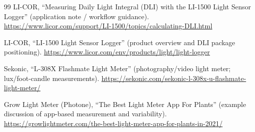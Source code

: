 \documentclass[11pt]{article}
\begin{document}
\begin{thebibliography}{99}
LI-COR, ``Measuring Daily Light Integral (DLI) with the LI-1500 Light Sensor Logger'' (application note / workflow guidance).
\href{https://www.licor.com/support/LI-1500/topics/calculating-DLI.html}{https://www.licor.com/support/LI-1500/topics/calculating-DLI.html}

LI-COR, ``LI-1500 Light Sensor Logger'' (product overview and DLI package positioning).
\href{https://www.licor.com/env/products/light/light-logger}{https://www.licor.com/env/products/light/light-logger}

Sekonic, ``L-308X Flashmate Light Meter'' (photography/video light meter; lux/foot-candle measurements).
\href{https://sekonic.com/sekonic-l-308x-u-flashmate-light-meter/}{https://sekonic.com/sekonic-l-308x-u-flashmate-light-meter/}

Grow Light Meter (Photone), ``The Best Light Meter App For Plants'' (example discussion of app-based measurement and variability).
\href{https://growlightmeter.com/the-best-light-meter-app-for-plants-in-2021/}{https://growlightmeter.com/the-best-light-meter-app-for-plants-in-2021/}
\end{thebibliography}
\end{document}
